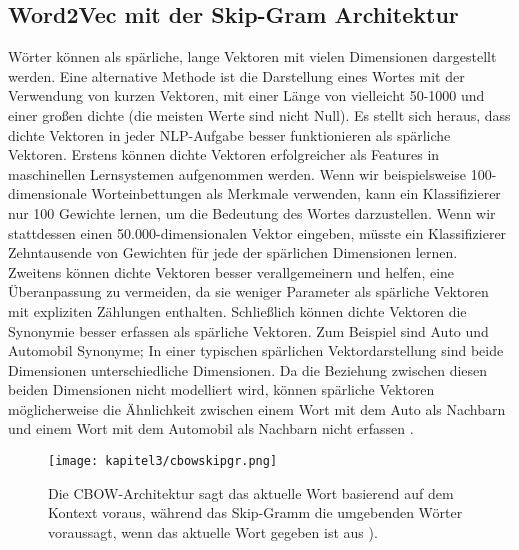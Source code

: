 



\subsection{Word2Vec mit der Skip-Gram Architektur}

Wörter können als spärliche, lange Vektoren mit vielen Dimensionen dargestellt werden. Eine alternative Methode ist die Darstellung eines Wortes mit der Verwendung von kurzen Vektoren, mit einer Länge von vielleicht 50-1000 und einer großen dichte (die meisten Werte sind nicht Null). Es stellt sich heraus, dass dichte Vektoren in jeder NLP-Aufgabe besser funktionieren als spärliche Vektoren. Erstens können dichte Vektoren erfolgreicher als Features in maschinellen Lernsystemen aufgenommen werden. Wenn wir beispielsweise 100-dimensionale Worteinbettungen als Merkmale verwenden, kann ein Klassifizierer nur 100 Gewichte lernen, um die Bedeutung des Wortes darzustellen. Wenn wir stattdessen einen 50.000-dimensionalen Vektor eingeben, müsste ein Klassifizierer Zehntausende von Gewichten für jede der spärlichen Dimensionen lernen. Zweitens können dichte Vektoren besser verallgemeinern und helfen, eine Überanpassung zu vermeiden, da sie weniger Parameter als spärliche Vektoren mit expliziten Zählungen enthalten. Schließlich können dichte Vektoren die Synonymie besser erfassen als spärliche Vektoren. Zum Beispiel sind Auto und Automobil Synonyme; In einer typischen spärlichen Vektordarstellung sind beide Dimensionen unterschiedliche Dimensionen. Da die Beziehung zwischen diesen beiden Dimensionen nicht modelliert wird, können spärliche Vektoren möglicherweise die Ähnlichkeit zwischen einem Wort mit dem Auto als Nachbarn und einem Wort mit dem Automobil als Nachbarn nicht erfassen \cite*[110-111]{Jurafskya}.


\begin{figure}[H]
    \centering
    \texttt{[image: kapitel3/cbowskipgr.png]}
    \caption[Vergleich zwischen CBOW und Skip-Gram Architektur]{Die CBOW-Architektur sagt das aktuelle Wort basierend auf dem Kontext voraus, während das Skip-Gramm die umgebenden Wörter voraussagt, wenn das aktuelle Wort gegeben ist aus \cite*{Mikolov}).}
    \label{cbowskipgr}
\end{figure}

